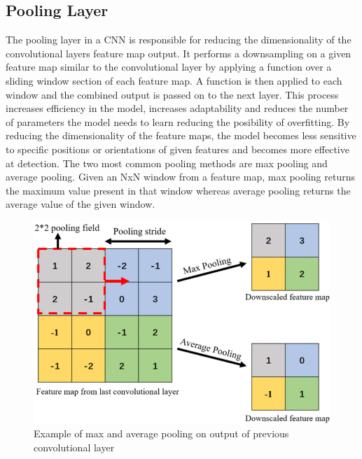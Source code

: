 \documentclass[10pt,twocolumn,letterpaper]{article}
\begin{document}
\subsection{Pooling Layer}
The pooling layer in a CNN is responsible for reducing the dimensionality of the convolutional 
layers feature map output. It performs a downsampling on a given feature map similar to 
the convolutional layer by applying a function over a sliding window section of each feature 
map. A function is then applied to each window and the combined output is passed on to 
the next layer. This process increases efficiency in the model, increases adaptability and 
reduces the number of parameters the model needs to learn reducing the posibility of 
overfitting. By reducing the dimensionality of the feature maps, the model becomes less 
sensitive to specific positions or orientations of given features and becomes more effective 
at detection. 
The two most common pooling methods are max pooling and average pooling. Given an NxN 
window from a feature map, max pooling returns the maximum value present in that window 
whereas average pooling returns the average value of the given window.
\begin{center}
\begin{figure}[H]
\includegraphics{Examples-for-max-and-average-pooling-layer.png}
\caption{Example of max and average pooling on output of previous convolutional layer \cite{pooling_diag}}
\end{figure}
\end{center}
\end{document}
